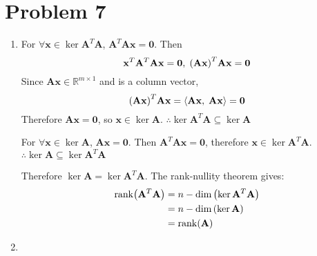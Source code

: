 \documentclass[10pt]{article}
\begin{document}
\section*{Problem 7}
\begin{enumerate}[leftmargin=*, label={(\alph*)}]
    \item For $\forall \mathbf{x} \in \ker{\mathbf{A}^T\mathbf{A}}$, $\mathbf{A}^T\mathbf{Ax = 0}$. Then
    $$\mathbf{x}^T\mathbf{A}^T\mathbf{Ax = 0}, \; \qty(\mathbf{Ax})^T\mathbf{Ax = 0}$$
    Since $\mathbf{Ax} \in \mathbb{R}^{m \times 1}$ and is a column vector, 
    $$\qty(\mathbf{Ax})^T\mathbf{Ax} = \langle \mathbf{Ax}, \; \mathbf{Ax} \rangle = \mathbf{0}$$
    Therefore $\mathbf{Ax = 0}$, so $\mathbf{x} \in \ker{\mathbf{A}}$. $\therefore \ker{\mathbf{A}^T\mathbf{A}} \subseteq \ker{\mathbf{A}}$
    \vspace{2mm}

    For $\forall \mathbf{x} \in \ker{\mathbf{A}}$, $\mathbf{Ax = 0}$. Then $\mathbf{A}^T\mathbf{Ax = 0}$, therefore $\mathbf{x} \in \ker{\mathbf{A}^T\mathbf{A}}$. $\therefore \ker{\mathbf{A}} \subseteq \ker{\mathbf{A}^T\mathbf{A}}$
    \vspace{2mm}

    Therefore $\ker{\mathbf{A}} = \ker{\mathbf{A}^T\mathbf{A}}$. The rank-nullity theorem gives:
    \begin{align*}
        \mathrm{rank}\qty(\mathbf{A}^T\mathbf{A}) &= n - \dim\qty(\ker{\mathbf{A}^T\mathbf{A}}) \\
        &= n - \dim\qty(\ker{\mathbf{A}}) \\
        &= \mathrm{rank}\qty(\mathbf{A})
    \end{align*}
    \item 

\end{enumerate}
\end{document}
